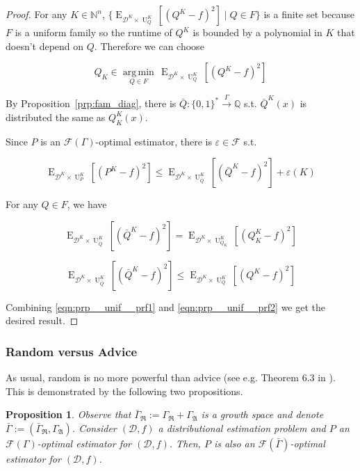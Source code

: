\documentclass[11pt]{article}
\numberwithin{equation}{section}
\theoremstyle{definition}
\theoremstyle{plain}
\newtheorem{proposition}{Proposition}[section]
\newcommand{\Bool}{\{0,1\}}
\newcommand{\Words}{{\Bool^*}}
\DeclareMathOperator{\E}{E}
\DeclareMathOperator{\Un}{U}
\newcommand{\Argmin}[1]{\underset{#1}{\operatorname{arg\,min}}\,}
\newcommand{\Nats}{\mathbb{N}}
\newcommand{\Rats}{\mathbb{Q}}
\newcommand{\Dist}{\mathcal{D}}
\newcommand{\GrowR}{\Gamma_{\mathfrak{R}}}
\newcommand{\GrowA}{\Gamma_{\mathfrak{A}}}
\newcommand{\Fall}{\mathcal{F}}
\newcommand{\EG}{\Fall(\Gamma)}
\newcommand{\Scheme}{\xrightarrow{\Gamma}}
\begin{document}
\begin{proof}

For any $K \in \Nats^n$, $\{\E_{\Dist^{K} \times \Un_Q^{K}}[(Q^{K} - f)^2] \mid Q \in F\}$ is a finite set because $F$ is a uniform family so the runtime of $Q^{K}$ is bounded by a polynomial in $K$ that doesn't depend on $Q$. Therefore we can choose 

\[Q_{K} \in \Argmin{Q \in F} \E_{\Dist^{K} \times \Un_Q^{K}}[(Q^{K} - f)^2]\]

By Proposition~\ref{prp:fam_diag}, there is $\bar{Q}: \Words \Scheme \Rats$ s.t. $\bar{Q}^{K}(x)$ is distributed the same as $Q_{K}^{K}(x)$.

Since $P$ is an $\EG$-optimal estimator, there is $\varepsilon \in \Fall$ s.t.

\begin{equation}
\label{eqn:prp__unif__prf1}
\E_{\Dist^{K} \times \Un_P^{K}}[(P^{K} - f)^2] \leq \E_{\Dist^{K} \times \Un_{\bar{Q}}^{K}}[(\bar{Q}^{K} - f)^2] + \varepsilon(K)
\end{equation}

For any $Q \in F$, we have 

$$\E_{\Dist^{K} \times \Un_{\bar{Q}}^{K}}[(\bar{Q}^{K} - f)^2]=\E_{\Dist^{K} \times \Un_{Q_{K}}^{K}}[(Q_{K}^{K} - f)^2]$$

\begin{equation}
\label{eqn:prp__unif__prf2}
\E_{\Dist^{K} \times \Un_{\bar{Q}}^{K}}[(\bar{Q}^{K} - f)^2] \leq \E_{\Dist^{K} \times \Un_Q^{K}}[(Q^{K} - f)^2]
\end{equation}

Combining \ref{eqn:prp__unif__prf1} and \ref{eqn:prp__unif__prf2} we get the desired result.
\end{proof}

\subsubsection{Random versus Advice}

As usual, random is no more powerful than advice (see e.g. Theorem 6.3 in \cite{Goldreich_2008}). This is demonstrated by the following two propositions.

\begin{proposition}

Observe that $\bar{\Gamma}_{\mathfrak{R}}:=\GrowR+\GrowA$ is a growth space and denote $\bar{\Gamma}:=(\bar{\Gamma}_{\mathfrak{R}},\GrowA)$. Consider $(\Dist,f)$ a distributional estimation problem and $P$ an $\EG$-optimal estimator for $(\Dist,f)$. Then, $P$ is also an $\Fall(\bar{\Gamma})$-optimal estimator for $(\Dist,f)$.

\end{proposition}
\end{document}
